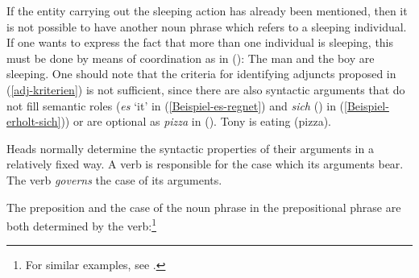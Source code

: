 \addlines
If the entity carrying out the sleeping action has already been mentioned, then it is not possible to have another noun phrase which refers to
a sleeping individual. If one wants to express the fact that more than one individual is sleeping, this must be done by means of coordination as in ():
\ea
The man and the boy are sleeping.
\z
One should note that the criteria for identifying adjuncts proposed in (\ref{adj-kriterien}) is not
sufficient, since there are also syntactic arguments that do not fill semantic roles (\eg \emph{es} `it' in (\ref{Beispiel-es-regnet}) and \emph{sich} (\REFL)
in (\ref{Beispiel-erholt-sich})) or are optional as \emph{pizza} in ().
\ea
Tony is eating (pizza).
\z

\noindent
Heads normally determine the syntactic properties of their arguments in a relatively fixed way.
A verb is responsible for the case which its arguments bear.
\eal
{}
\zl
The verb \emph{governs} the case of its arguments.

The preposition and the case of the noun phrase in the prepositional phrase are both determined by the verb:\footnote{%
  For similar examples, see .
}



